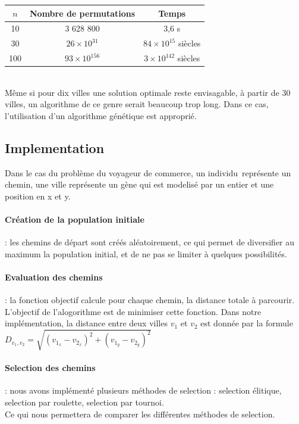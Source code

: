 \documentclass{article}
\begin{document}
	\begin{tabular}{ccc}
	\hline
	$n$ & Nombre de permutations & Temps \\
	\hline
	10 & 3 628 800 & 3,6 s\\
	30 & $26 \times 10^{31}$ & $84 \times 10^{15}$ siècles \\
	100 & $93 \times 10^{156}$ & $3 \times 10^{142}$ siècles \\
	\hline
	\end{tabular}
	\\
    Même si pour dix villes une solution optimale reste envisagable, à partir de 30 villes, un algorithme de ce genre serait beaucoup trop long.
	Dans ce cas, l'utilisation d'un algorithme génétique est approprié.

    \subsection{Implementation}

    Dans le cas du problème du voyageur de commerce, un individu représente un chemin, une ville représente un gène qui est modelisé par un entier et une position en x et y.

    \paragraph{Création de la population initiale}: les chemins de départ sont créés aléatoirement, ce qui permet de diversifier au maximum la population initial, et de ne pas se limiter à quelques possibilités.

    \paragraph{Evaluation des chemins}: la fonction objectif calcule pour chaque chemin, la distance totale à parcourir. L'objectif de l'alogorithme est de minimiser cette fonction. Dans notre implémentation, la distance entre deux villes $v_1$ et $v_2$ est donnée par la formule $D_{v_1, v_2} = \sqrt{(v_{1_x}-v_{2_x})^2 + (v_{1_y}-v_{2_y})^2}$

    \paragraph{Selection des chemins}: nous avons implémenté plusieurs méthodes de selection : selection élitique,  selection par roulette, selection par tournoi. \\
    Ce qui nous permettera de comparer les différentes méthodes de selection.
\end{document}
